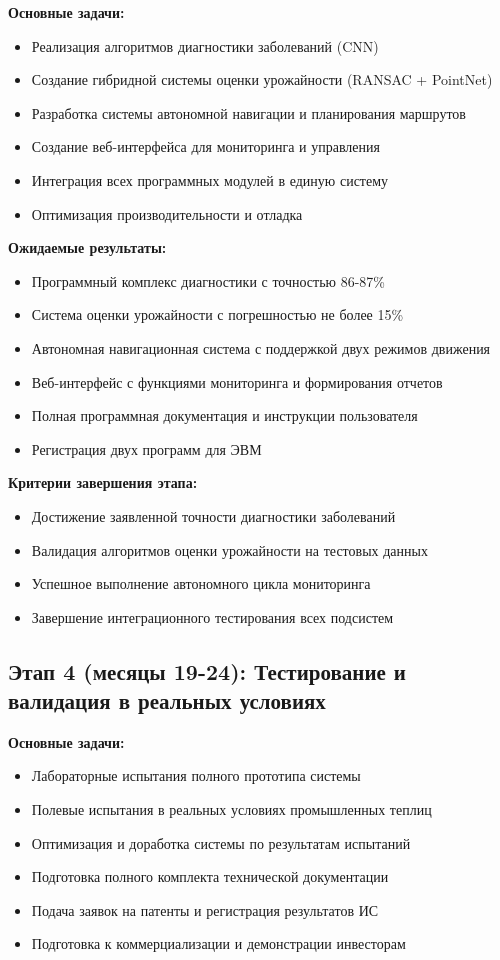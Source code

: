 \documentclass[12pt,a4paper]{article}
\begin{document}
\textbf{Основные задачи:}
\begin{itemize}
    \item Реализация алгоритмов диагностики заболеваний (CNN)
    \item Создание гибридной системы оценки урожайности (RANSAC + PointNet)
    \item Разработка системы автономной навигации и планирования маршрутов
    \item Создание веб-интерфейса для мониторинга и управления
    \item Интеграция всех программных модулей в единую систему
    \item Оптимизация производительности и отладка
\end{itemize}

\textbf{Ожидаемые результаты:}
\begin{itemize}
    \item Программный комплекс диагностики с точностью 86-87\%
    \item Система оценки урожайности с погрешностью не более 15\%
    \item Автономная навигационная система с поддержкой двух режимов движения
    \item Веб-интерфейс с функциями мониторинга и формирования отчетов
    \item Полная программная документация и инструкции пользователя
    \item Регистрация двух программ для ЭВМ
\end{itemize}

\textbf{Критерии завершения этапа:}
\begin{itemize}
    \item Достижение заявленной точности диагностики заболеваний
    \item Валидация алгоритмов оценки урожайности на тестовых данных
    \item Успешное выполнение автономного цикла мониторинга
    \item Завершение интеграционного тестирования всех подсистем
\end{itemize}

\subsection{Этап 4 (месяцы 19-24): Тестирование и валидация в реальных условиях}

\textbf{Основные задачи:}
\begin{itemize}
    \item Лабораторные испытания полного прототипа системы
    \item Полевые испытания в реальных условиях промышленных теплиц
    \item Оптимизация и доработка системы по результатам испытаний
    \item Подготовка полного комплекта технической документации
    \item Подача заявок на патенты и регистрация результатов ИС
    \item Подготовка к коммерциализации и демонстрации инвесторам
\end{itemize}
\end{document}

